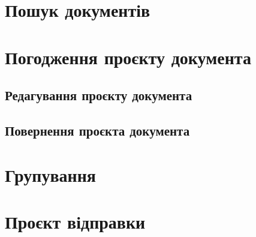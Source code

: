 \section{Пошук документів}

\section{Погодження проєкту документа}

\subsection{Редагування проєкту документа}

\subsection{Повернення проєкта документа}

\section{Групування}

\section{Проєкт відправки}

